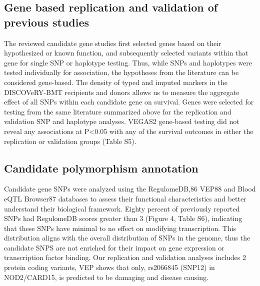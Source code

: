 \documentclass[]{DissertateUSU}
\begin{document}
\subsection{Gene based replication and validation of previous
studies}\label{gene-based-replication-and-validation-of-previous-studies}

The reviewed candidate gene studies first selected genes based on their
hypothesized or known function, and subsequently selected variants
within that gene for single SNP or haplotype testing. Thus, while SNPs
and haplotypes were tested individually for association, the hypotheses
from the literature can be considered gene-based. The density of typed
and imputed markers in the DISCOVeRY-BMT recipients and donors allows us
to measure the aggregate effect of all SNPs within each candidate gene
on survival. Genes were selected for testing from the same literature
summarized above for the replication and validation SNP and haplotype
analyses. VEGAS2 gene-based testing did not reveal any associations at
P\textless{}0.05 with any of the survival outcomes in either the
replication or validation groups (Table S5).

\subsection{Candidate polymorphism
annotation}\label{candidate-polymorphism-annotation}

Candidate gene SNPs were analyzed using the RegulomeDB,86 VEP88 and
Blood eQTL Browser87 databases to assess their functional
characteristics and better understand their biological framework. Eighty
percent of previously reported SNPs had RegulomeDB scores greater than 3
(Figure 4, Table S6), indicating that these SNPs have minimal to no
effect on modifying transcription. This distribution aligns with the
overall distribution of SNPs in the genome, thus the candidate SNPS are
not enriched for their impact on gene expression or transcription factor
binding. Our replication and validation analyses includes 2 protein
coding variants, VEP shows that only, rs2066845 (SNP12) in NOD2/CARD15,
is predicted to be damaging and disease causing.
\end{document}
